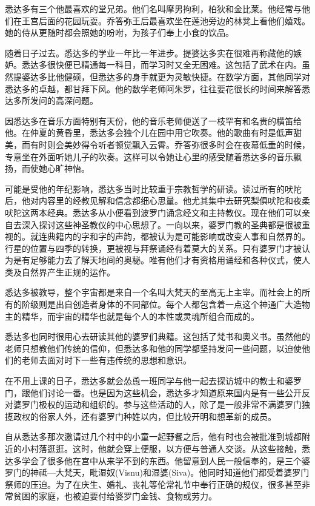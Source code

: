 \documentclass[12pt,twoside,openany]{book}
\begin{document}
悉达多有三个他最喜欢的堂兄弟。他们名叫摩男拘利，柏狄和金比莱。他经常与他们在王宫后面的花园玩耍。乔答弥王后最喜欢坐在莲池旁边的林凳上看他们嬉戏。她的侍从更随时都会照她的吩咐，为孩子们奉上小食的饮品。

随着日子过去。悉达多的学业一年比一年进步。提婆达多实在很难再称藏他的嫉妒。悉达多很快便已精通每一科目，而学习时又全无困难。这包括了武术在内。虽然提婆达多比他健硕，但悉达多的身手就更为灵敏快捷。在数学方面，其他同学对悉达多的卓越，都甘拜下风。他的数学老师阿朱罗，往往要花很长的时间来解答悉达多所发问的高深问题。

因悉达多在音乐方面特别有天份，他的音乐老师便送了一枝罕有和名贵的横笛给他。在仲夏的黄昏里，悉达多会独个儿在园中用它吹奏。他的歌曲有时是低声甜美，而有时则会美妙得令听者顿觉飘入云霄。乔答弥很多时会在夜幕低垂的时候，专意坐在外面听她儿子的吹奏。这样可以令她让心里的感受随着悉达多的音乐飘扬，而使她心旷神怡。

可能是受他的年纪影响，悉达多当时比较重于宗教哲学的研读。读过所有的吠陀后，他对内容里的经教见解和信念都细心思量。他尤其集中去研究梨俱吠陀和夜柔吠陀这两本经典。悉达多从小便看到波罗门诵念经文和主持教仪。现在他们可以亲自去深入探讨这些神圣教仪的中心思想了。一向以来，婆罗门教的圣典都是很被重视的。就连典籍内的字和字的声韵，都被认为是可能影响或改变人事和自然界的。行星的位置与四季的转换，更被视与拜祭诵经有着莫大的关系。只有婆罗门才被认为是有足够能力去了解天地间的奥秘。唯有他们才有资格用诵经和各种仪式，使人类及自然界产生正规的运作。

悉达多被教导，整个宇宙都是来自一个名叫大梵天的至高无上主宰。而社会上的所有的阶级则是出自创造者身体的不同部位。每个人都包含着一点这个神通广大造物主的精华，而宇宙的精华也就是每个人的本性或灵魂所组合而成的。

悉达多也同时很用心去研读其他的婆罗们典籍。这包括了梵书和奥义书。虽然他的老师只想教他们传统的信仰，但悉达多和他的同学都坚持发问一些问题，以迫使他们的老师去面对时下一些有违传统的思想和意识。

在不用上课的日子，悉达多就会怂恿一班同学与他一起去探访城中的教士和婆罗门，跟他们讨论一番。也是因为这些机会，悉达多才知道原来国内是有一些公开反对婆罗门极权的运动和组织的。参与这些活动的人，除了是一般非常不满婆罗门独揽政权的俗家人外，还有婆罗门种姓以内，但比较开明和想革新的成员。

自从悉达多那次邀请过几个村中的小童一起野餐之后，他有时也会被批准到城都附近的小村落逛逛。这时，他就会穿上便服，以方便与普通人交谈。从这些接触，悉达多学会了很多他在宫中从来学不到的东西。他留意到人民一般信奉的，是三个婆罗门的神祗—大梵天，毗湿奴(Visnu)和湿婆(Siva)。他同时知道他们都受着婆罗门祭师的压迫。为了在庆生、婚礼、丧礼等伦常礼节中奉行正确的规仪，很多甚至非常贫困的家庭，也被迫要付给婆罗门金钱、食物或劳力。
\end{document}

